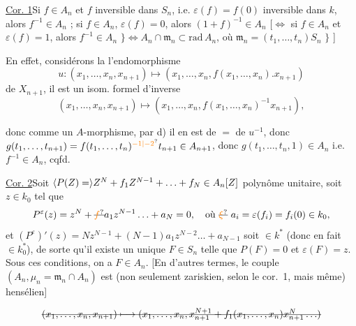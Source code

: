 \uline{Cor. 1}\qquad Si $f\in A_n$ et $f$ inversible dans $S_n$, i.e. $\varepsilon(f)=f(0)$ inversible dans $k$, alors $f^{-1}\in A_n$ ; \inserted{$\Longleftrightarrow$}  si $f\in A_n$, $\varepsilon(f)=0$, alors $(1+f)^{-1}\in A_n$ [$\Longleftrightarrow$ si $f\in A_n$ et $\varepsilon(f)=1$, alors $f^{-1}\in A_n$ $\}\Longleftrightarrow A_n\cap\mathfrak m_n\subset\mathrm{rad}\,A_n$, où  $\mathfrak m_n=(t_1,\ldots,t_n)S_n$ $\}$ ]


En effet, considérons la  l'endomorphisme
\[
 u:(x_1,\ldots,x_n,x_{n+1})\mapsto(x_1,\ldots,x_n,f(x_1,\ldots,x_n).x_{n+1})
\]
de $X_{n+1}$, il est un isom. formel d'inverse
\[
 (x_1,\ldots,x_n,x_{n+1})\mapsto(x_1,\ldots,x_n,f(x_1,\ldots,x_n)^{-1}x_{n+1}),
\]

donc comme  un $A$-morphisme, par d) il en est de $=$ de $u^{-1}$, donc $g(t_1,\ldots,t_{n+1})=f(t_1,\ldots,t_n)^{\unsure{-1|-2}}t_{n+1}\in A_{n+1}$,  donc $g(t_1,\ldots,t_n,1)\in A_n$ i.e. $f^{-1}\in A_n$, cqfd.



\uline{Cor. 2}\qquad Soit $\inserted{P(Z)=}Z^N+f_1 Z^{N-1}+\ldots+f_N\in A_n[Z]$ polynôme unitaire, soit $z\in k_0$ tel que
\[
 P^\varepsilon(z)=z^N+\deleted{\unsure{f}}a_1 z^{N-1}\ldots+a_N=0,\quad
 \text{où }\deleted{\unsure{\xi}}\ a_i=\varepsilon(f_i)=f_i(0)\in k_0,
\]
et $(P^\varepsilon)'(z)=Nz^{N-1}+(N-1)a_1z^{N-2}\ldots+a_{N-1}$ soit $\in k^*$ (donc en fait $\in k_0^*$), de sorte qu'il existe un unique $F\in S_n$ telle que $P(F)=0$ et $\varepsilon(F)=z$. Sous ces conditions, on a $F\in A_n$. [En d'autres termes, le couple $(A_n,\mu_n=\mathfrak m_n\cap A_n)$ est (non seulement zariskien, selon le cor.~1, mais même) hensélien]

\[
\deleted{(x_1,\ldots,x_n,x_{n+1})\longmapsto (x_1,\ldots,x_n,x_{n+1}^{N+1}+f_1(x_1,\ldots,x_n)x_{n+1}^{N}\ldots)}
\]

